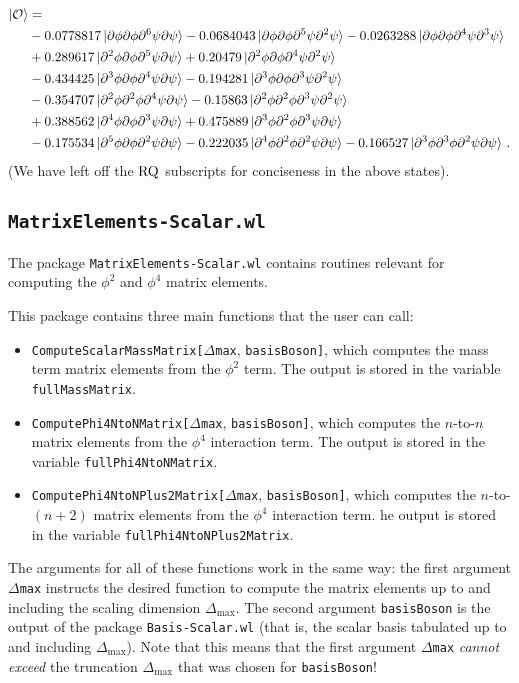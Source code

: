 \documentclass[12pt]{article}
\renewcommand{\d}{\partial}
\newcommand{\CO}{{\cal O}}
\newcommand{\nn}{\nonumber}
\begin{document}
\begin{equation}
\begin{aligned}
\ket{\CO}&=\\
&-0.0778817\ket{\d\phi\d\phi\d^6\psi\d\psi}
-0.0684043\ket{\d\phi\d\phi\d^5\psi\d^2\psi}
-0.0263288\ket{\d\phi\d\phi\d^4\psi\d^3\psi} \\
&+0.289617\ket{\d^2\phi\d\phi\d^5\psi\d\psi}
+0.20479\ket{\d^2\phi\d\phi\d^4\psi\d^2\psi}\\
&-0.434425\ket{\d^3\phi\d\phi\d^4\psi\d\psi}
-0.194281\ket{\d^3\phi\d\phi\d^3\psi\d^2\psi}\\
&-0.354707\ket{\d^2\phi\d^2\phi\d^4\psi\d\psi}
-0.15863\ket{\d^2\phi\d^2\phi\d^3\psi\d^2\psi}\\
&+0.388562\ket{\d^4\phi\d\phi\d^3\psi\d\psi}
+0.475889\ket{\d^3\phi\d^2\phi\d^3\psi\d\psi}\\
&-0.175534\ket{\d^5\phi\d\phi\d^2\psi\d\psi}
-0.222035\ket{\d^4\phi\d^2\phi\d^2\psi\d\psi}
-0.166527\ket{\d^3\phi\d^3\phi\d^2\psi\d\psi} \, .
\end{aligned}\nn
\end{equation}
(We have left off the ${\rm RQ}$ subscripts for conciseness in the above states).

\subsection{{\tt MatrixElements-Scalar.wl}} The package {\tt MatrixElements-Scalar.wl} contains routines relevant for computing the $\phi^2$ and $\phi^4$ matrix elements.

This package contains three main functions that the user can call: \begin{itemize}
	\item {\tt ComputeScalarMassMatrix[}$\Delta${\tt max}, {\tt basisBoson]}, which computes the mass term matrix elements from the $\phi^2$ term. The output is stored in the variable {\tt fullMassMatrix}.
	\item {\tt ComputePhi4NtoNMatrix[}$\Delta${\tt max}, {\tt basisBoson]}, which computes the $n$-to-$n$ matrix elements from the $\phi^4$ interaction term.  The output is stored in the variable {\tt fullPhi4NtoNMatrix}.
	\item {\tt ComputePhi4NtoNPlus2Matrix[}$\Delta${\tt max}, {\tt basisBoson]}, which computes the $n$-to-$(n+2)$ matrix elements from the $\phi^4$ interaction term. he output is stored in the variable {\tt fullPhi4NtoNPlus2Matrix}.
\end{itemize} The arguments for all of these functions work in the same way: the first argument {\tt$\Delta$max} instructs the desired function to compute the matrix elements up to and including the scaling dimension $\Delta_{\textrm{max}}$. The second argument {\tt basisBoson} is the output of the package {\tt Basis-Scalar.wl} (that is, the scalar basis tabulated up to and including $\Delta_{\textrm{max}}$). Note that this means that the first argument {\tt$\Delta$max} \textit{cannot exceed} the truncation $\Delta_{\textrm{max}}$ that was chosen for {\tt basisBoson}!
\end{document}
